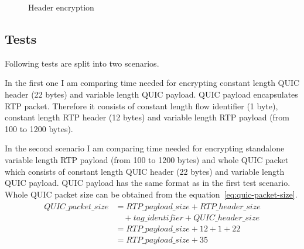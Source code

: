 \begin{figure}[h]
    \centering
    \caption{Header encryption}
    \label{fig:header_enc}
\end{figure}

\subsection{Tests}
\label{subsec:tests}
Following tests are split into two scenarios.

In the first one I am comparing time needed for encrypting constant length QUIC header (22 bytes) and variable length QUIC payload.
QUIC payload encapsulates RTP packet.
Therefore it consists of constant length flow identifier (1 byte), constant length RTP header (12 bytes) and variable length RTP payload (from 100 to 1200 bytes).

In the second scenario I am comparing time needed for encrypting standalone variable length RTP payload (from 100 to 1200 bytes) and whole QUIC packet which consists of constant length QUIC header (22 bytes) and variable length QUIC payload.
QUIC payload has the same format as in the first test scenario.
Whole QUIC packet size can be obtained from the equation~\ref{eq:quic-packet-size}.
\begin{align}
    \begin{split}
        QUIC\_packet\_size & = RTP\_payload\_size + RTP\_header\_size \\
        & \quad + tag\_identifier + QUIC\_header\_size \\
        & = RTP\_payload\_size + 12 + 1 + 22 \\
        & = RTP\_payload\_size + 35
    \end{split}
    \label{eq:quic-packet-size}
\end{align}


